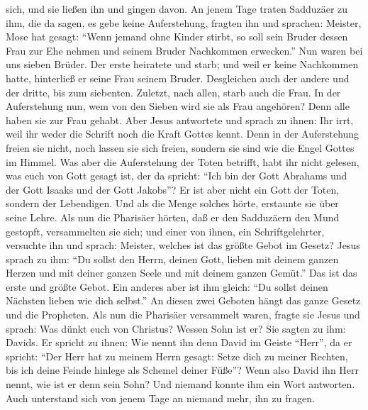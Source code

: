 sich, und sie ließen ihn und gingen davon.  An jenem Tage
traten Sadduzäer zu ihm, die da sagen, es gebe keine Auferstehung,
fragten ihn  und sprachen: Meister, Mose hat gesagt:
``Wenn jemand ohne Kinder stirbt, so soll sein Bruder dessen Frau zur
Ehe nehmen und seinem Bruder Nachkommen erwecken.''  Nun
waren bei uns sieben Brüder. Der erste heiratete und starb; und weil er
keine Nachkommen hatte, hinterließ er seine Frau seinem Bruder.
 Desgleichen auch der andere und der dritte, bis zum
siebenten.  Zuletzt, nach allen, starb auch die Frau.
 In der Auferstehung nun, wem von den Sieben wird sie als
Frau angehören? Denn alle haben sie zur Frau gehabt. 
Aber Jesus antwortete und sprach zu ihnen: Ihr irrt, weil ihr weder die
Schrift noch die Kraft Gottes kennt.  Denn in der
Auferstehung freien sie nicht, noch lassen sie sich freien, sondern sie
sind wie die Engel Gottes im Himmel.  Was aber die
Auferstehung der Toten betrifft, habt ihr nicht gelesen, was euch von
Gott gesagt ist, der da spricht:  ``Ich bin der Gott
Abrahams und der Gott Isaaks und der Gott Jakobs''? Er ist aber nicht
ein Gott der Toten, sondern der Lebendigen.  Und als die
Menge solches hörte, erstaunte sie über seine Lehre.  Als
nun die Pharisäer hörten, daß er den Sadduzäern den Mund gestopft,
versammelten sie sich;  und einer von ihnen, ein
Schriftgelehrter, versuchte ihn und sprach:  Meister,
welches ist das größte Gebot im Gesetz?  Jesus sprach zu
ihm: ``Du sollst den Herrn, deinen Gott, lieben mit deinem ganzen Herzen
und mit deiner ganzen Seele und mit deinem ganzen Gemüt.''
 Das ist das erste und größte Gebot.  Ein
anderes aber ist ihm gleich: ``Du sollst deinen Nächsten lieben wie dich
selbst.''  An diesen zwei Geboten hängt das ganze Gesetz
und die Propheten.  Als nun die Pharisäer versammelt
waren, fragte sie Jesus  und sprach: Was dünkt euch von
Christus? Wessen Sohn ist er? Sie sagten zu ihm: Davids. 
Er spricht zu ihnen: Wie nennt ihn denn David im Geiste ``Herr'', da er
spricht:  ``Der Herr hat zu meinem Herrn gesagt: Setze
dich zu meiner Rechten, bis ich deine Feinde hinlege als Schemel deiner
Füße''?  Wenn also David ihn Herr nennt, wie ist er denn
sein Sohn?  Und niemand konnte ihm ein Wort antworten.
Auch unterstand sich von jenem Tage an niemand mehr, ihn zu fragen.

